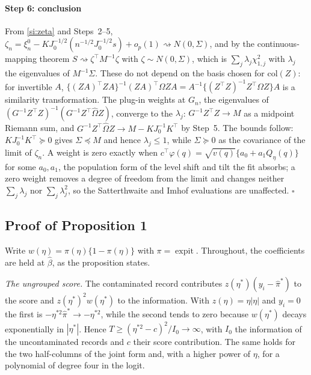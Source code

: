 \documentclass[11pt]{article}
\providecommand{\qed}{\ensuremath{\square}}
\begin{document}
\paragraph{Step 6: conclusion} From \eqref{si:zeta} and Steps~2--5,
$\zeta_n=\xi_n^0-KJ_0^{-1/2}(n^{-1/2}J_0^{-1/2}s)+o_p(1)\rightsquigarrow N(0,\Sigma)$, and by the
continuous-mapping theorem $S\rightsquigarrow\zeta^\top M^{-1}\zeta$ with $\zeta\sim N(0,\Sigma)$,
which is $\sum_j\lambda_j\chi^2_{1,j}$ with $\lambda_j$ the eigenvalues of $M^{-1}\Sigma$. These do
not depend on the basis chosen for $\mathrm{col}(Z)$: for invertible $A$,
$\{(ZA)^\top ZA\}^{-1}(ZA)^\top\Omega ZA=A^{-1}\{(Z^\top Z)^{-1}Z^\top\Omega Z\}A$ is a similarity
transformation. The plug-in weights at $G_n$, the eigenvalues of
$(G^{-1}Z^\top Z)^{-1}(G^{-1}Z^\top\widehat\Omega Z)$, converge to the $\lambda_j$: $G^{-1}Z^\top Z\to
M$ as a midpoint Riemann sum, and $G^{-1}Z^\top\widehat\Omega Z\to M-KJ_0^{-1}K^\top$ by Step~5. The
bounds follow: $KJ_0^{-1}K^\top\succeq0$ gives $\Sigma\preceq M$ and hence $\lambda_j\le1$, while
$\Sigma\succeq0$ as the covariance of the limit of $\zeta_n$. A weight is zero exactly when
$c^\top\varphi(q)=\sqrt{v(q)}\{a_0+a_1Q_\eta(q)\}$ for some $a_0,a_1$, the population form of the
level shift and tilt the fit absorbs; a zero weight removes a degree of freedom from the limit and
changes neither $\sum_j\lambda_j$ nor $\sum_j\lambda_j^2$, so the Satterthwaite and Imhof evaluations
are unaffected. \qed

\subsection*{Proof of Proposition 1}

Write $w(\eta)=\pi(\eta)\{1-\pi(\eta)\}$ with $\pi=\operatorname{expit}$. Throughout, the coefficients
are held at $\hat\beta$, as the proposition states.

\emph{The ungrouped score.} The contaminated record contributes $z(\eta^{*})(y_i-\hat\pi^{*})$ to
the score and $z(\eta^{*})^{2}w(\eta^{*})$ to the information. With $z(\eta)=\eta|\eta|$ and $y_i=0$ the
first is $-\eta^{*2}\hat\pi^{*}\to-\eta^{*2}$, while the second tends to zero because $w(\eta^{*})$
decays exponentially in $|\eta^{*}|$. Hence $T\ge(\eta^{*2}-c)^{2}/I_{0}\to\infty$, with $I_{0}$ the
information of the uncontaminated records and $c$ their score contribution. The same holds for the
two half-columns of the joint form and, with a higher power of $\eta$, for a polynomial of degree
four in the logit.
\end{document}
